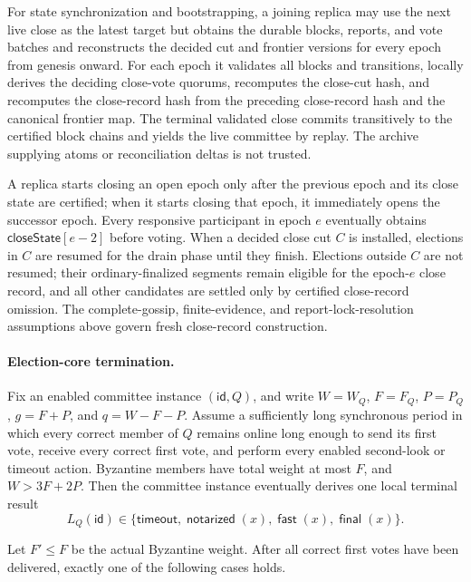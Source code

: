 \documentclass[sigplan,twocolumn,review,anonymous]{acmart}
\newcommand{\func}[1]{\operatorname{\mathsf{#1}}}
\newcommand{\id}{\mathsf{id}}
\newcommand{\timeoutOutcome}{\mathsf{timeout}}
\newcommand{\notarized}{\func{notarized}}
\newcommand{\fast}{\func{fast}}
\newcommand{\final}{\func{final}}
\newcommand{\closeState}{\mathsf{closeState}}
\begin{document}
For state synchronization and bootstrapping, a joining replica may use the next live close as the latest
target but obtains the durable blocks, reports, and vote batches and reconstructs the decided cut and frontier
versions for every epoch from genesis onward.  For each epoch it validates all blocks and transitions,
locally derives the deciding close-vote quorums, recomputes the close-cut hash, and recomputes the
close-record hash from the preceding close-record hash and the canonical frontier map.  The terminal
validated close commits transitively to the certified block chains and yields the live committee by
replay.  The archive supplying atoms or reconciliation deltas is not trusted.

A replica starts closing an open epoch only after the previous epoch and its close state are
certified; when it starts closing that epoch, it immediately opens the successor epoch.  Every
responsive participant in epoch \(e\) eventually obtains \(\closeState[e-2]\) before voting.  When
a decided close cut \(C\) is installed, elections in \(C\) are resumed for the drain phase until they
finish.  Elections outside \(C\) are not resumed; their ordinary-finalized segments remain eligible for
the epoch-\(e\) close record, and all other candidates are settled only by certified close-record
omission.  The complete-gossip, finite-evidence, and report-lock-resolution assumptions above govern
fresh close-record construction.

\paragraph{Election-core termination.}
Fix an enabled committee instance \((\id,Q)\), and write
\(W=W_Q\), \(F=F_Q\), \(P=P_Q\), \(g=F+P\), and \(q=W-F-P\).
Assume a sufficiently long synchronous period in which every correct member of \(Q\) remains
online long enough to send its first vote, receive every correct first vote, and perform every enabled
second-look or timeout action.  Byzantine members have total weight at most \(F\), and
\(W>3F+2P\).  Then the committee instance eventually derives one local terminal result
\[
L_Q(\id)\in\{\timeoutOutcome,\notarized(x),\fast(x),\final(x)\}.
\]

Let \(F'\le F\) be the actual Byzantine weight.  After all correct first votes have been delivered,
exactly one of the following cases holds.
\end{document}
